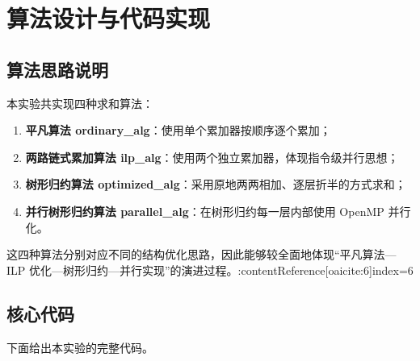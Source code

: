 \documentclass[a4paper,12pt]{ctexart}
\begin{document}
\section{算法设计与代码实现}

\subsection{算法思路说明}

本实验共实现四种求和算法：

\begin{enumerate}
  \item \textbf{平凡算法 ordinary\_alg}：使用单个累加器按顺序逐个累加；
  \item \textbf{两路链式累加算法 ilp\_alg}：使用两个独立累加器，体现指令级并行思想；
  \item \textbf{树形归约算法 optimized\_alg}：采用原地两两相加、逐层折半的方式求和；
  \item \textbf{并行树形归约算法 parallel\_alg}：在树形归约每一层内部使用 OpenMP 并行化。
\end{enumerate}

这四种算法分别对应不同的结构优化思路，因此能够较全面地体现“平凡算法—ILP 优化—树形归约—并行实现”的演进过程。:contentReference[oaicite:6]{index=6}

\subsection{核心代码}

下面给出本实验的完整代码。
\end{document}

